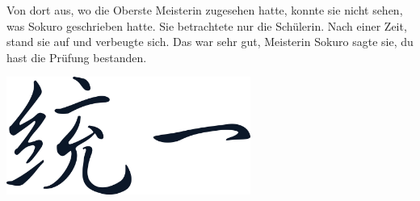 Von dort aus, wo die Oberste Meisterin zugesehen hatte, konnte sie nicht sehen, was Sokuro geschrieben hatte. Sie betrachtete nur die Schülerin. Nach einer Zeit, stand sie auf und verbeugte sich. Das war sehr gut, Meisterin Sokuro sagte sie, du hast die Prüfung bestanden.  \hfill {}

\begin{center}
\includegraphics[width=0.6\textwidth]{./bilder/vereinigung.png}
\end{center}
\newpage
 

